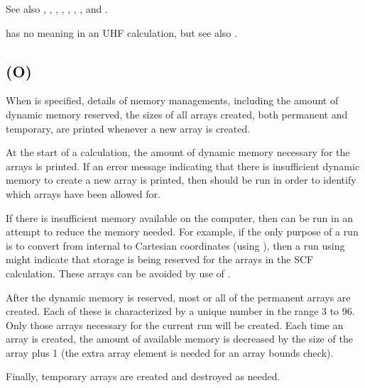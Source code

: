 See also , , , ,
, ,  , and .

         has no meaning in an UHF calculation, but see also .

\subsection*{ (O)}
When  is specified, details of memory managements,
including the amount of dynamic memory reserved, the sizes of all arrays
created, both permanent and temporary, are printed whenever a new
array is created.

At the start of a calculation, the amount of dynamic memory necessary
for the arrays is printed.  If an error message indicating that there
is insufficient dynamic memory to create a new array is printed, then
 should be run in order to identify which arrays have been
allowed for.

If there is insufficient memory available on the computer, then 
can be run in an attempt to reduce the memory needed.  For example,
if the only purpose of a run is to convert from internal to
Cartesian coordinates (using ), then a run using 
might indicate that storage is being reserved for the arrays in the
SCF calculation.  These arrays can be avoided by use of .

After the dynamic memory is reserved, most or all of the permanent
arrays are created.  Each of these is characterized by a unique number
in the range 3 to 96.  Only those arrays necessary for the current
run will be created.  Each time an array is created, the amount
of available memory is decreased by the size of the array plus 1
(the extra array element is needed for an array bounds check).

Finally, temporary arrays are created and destroyed as needed.

